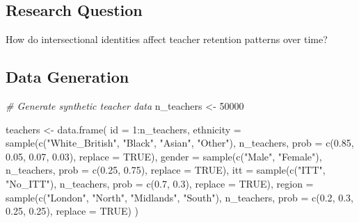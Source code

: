 \documentclass[
]{article}
\newenvironment{Shaded}{\begin{snugshade}}{\end{snugshade}}
\newcommand{\AttributeTok}[1]{\textcolor[rgb]{0.77,0.63,0.00}{#1}}
\newcommand{\CommentTok}[1]{\textcolor[rgb]{0.56,0.35,0.01}{\textit{#1}}}
\newcommand{\ConstantTok}[1]{\textcolor[rgb]{0.00,0.00,0.00}{#1}}
\newcommand{\DecValTok}[1]{\textcolor[rgb]{0.00,0.00,0.81}{#1}}
\newcommand{\FloatTok}[1]{\textcolor[rgb]{0.00,0.00,0.81}{#1}}
\newcommand{\FunctionTok}[1]{\textcolor[rgb]{0.00,0.00,0.00}{#1}}
\newcommand{\NormalTok}[1]{#1}
\newcommand{\OtherTok}[1]{\textcolor[rgb]{0.56,0.35,0.01}{#1}}
\newcommand{\SpecialCharTok}[1]{\textcolor[rgb]{0.00,0.00,0.00}{#1}}
\newcommand{\StringTok}[1]{\textcolor[rgb]{0.31,0.60,0.02}{#1}}
\begin{document}
\hypertarget{research-question-1}{%
\subsection{Research Question}\label{research-question-1}}

How do intersectional identities affect teacher retention patterns over
time?

\hypertarget{data-generation-1}{%
\subsection{Data Generation}\label{data-generation-1}}

\begin{Shaded}
\begin{Highlighting}[]
\CommentTok{\# Generate synthetic teacher data}
\NormalTok{n\_teachers }\OtherTok{\textless{}{-}} \DecValTok{50000}

\NormalTok{teachers }\OtherTok{\textless{}{-}} \FunctionTok{data.frame}\NormalTok{(}
  \AttributeTok{id =} \DecValTok{1}\SpecialCharTok{:}\NormalTok{n\_teachers,}
  \AttributeTok{ethnicity =} \FunctionTok{sample}\NormalTok{(}\FunctionTok{c}\NormalTok{(}\StringTok{"White\_British"}\NormalTok{, }\StringTok{"Black"}\NormalTok{, }\StringTok{"Asian"}\NormalTok{, }\StringTok{"Other"}\NormalTok{), }
\NormalTok{                    n\_teachers, }\AttributeTok{prob =} \FunctionTok{c}\NormalTok{(}\FloatTok{0.85}\NormalTok{, }\FloatTok{0.05}\NormalTok{, }\FloatTok{0.07}\NormalTok{, }\FloatTok{0.03}\NormalTok{), }\AttributeTok{replace =} \ConstantTok{TRUE}\NormalTok{),}
  \AttributeTok{gender =} \FunctionTok{sample}\NormalTok{(}\FunctionTok{c}\NormalTok{(}\StringTok{"Male"}\NormalTok{, }\StringTok{"Female"}\NormalTok{), n\_teachers, }\AttributeTok{prob =} \FunctionTok{c}\NormalTok{(}\FloatTok{0.25}\NormalTok{, }\FloatTok{0.75}\NormalTok{), }\AttributeTok{replace =} \ConstantTok{TRUE}\NormalTok{),}
  \AttributeTok{itt =} \FunctionTok{sample}\NormalTok{(}\FunctionTok{c}\NormalTok{(}\StringTok{"ITT"}\NormalTok{, }\StringTok{"No\_ITT"}\NormalTok{), n\_teachers, }\AttributeTok{prob =} \FunctionTok{c}\NormalTok{(}\FloatTok{0.7}\NormalTok{, }\FloatTok{0.3}\NormalTok{), }\AttributeTok{replace =} \ConstantTok{TRUE}\NormalTok{),}
  \AttributeTok{region =} \FunctionTok{sample}\NormalTok{(}\FunctionTok{c}\NormalTok{(}\StringTok{"London"}\NormalTok{, }\StringTok{"North"}\NormalTok{, }\StringTok{"Midlands"}\NormalTok{, }\StringTok{"South"}\NormalTok{), }
\NormalTok{                 n\_teachers, }\AttributeTok{prob =} \FunctionTok{c}\NormalTok{(}\FloatTok{0.2}\NormalTok{, }\FloatTok{0.3}\NormalTok{, }\FloatTok{0.25}\NormalTok{, }\FloatTok{0.25}\NormalTok{), }\AttributeTok{replace =} \ConstantTok{TRUE}\NormalTok{)}
\NormalTok{)}


\end{Highlighting}
\end{Shaded}
\end{document}
